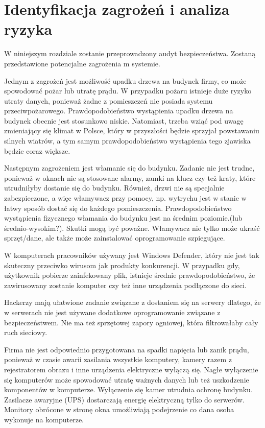 \newpage\section{Identyfikacja zagrożeń \newline i analiza ryzyka}
W niniejszym rozdziale zostanie przeprowadzony audyt bezpieczeństwa. Zostaną przedstawione potencjalne zagrożenia m systemie.

Jednym z zagrożeń jest możliwość upadku drzewa na budynek firmy, co może spowodować pożar lub utratę prądu. W przypadku pożaru istnieje duże ryzyko utraty danych, ponieważ żadne z pomieszczeń nie posiada systemu przeciwpożarowego.  Prawdopodobieństwo wystąpienia upadku drzewa na budynek obecnie jest stosunkowo niskie. Natomiast, trzeba wziąć pod uwagę zmieniający się klimat w Polsce, który w przyszłości będzie sprzyjał powstawaniu silnych wiatrów, a tym samym prawdopodobieństwo wystąpienia tego zjawiska będzie coraz większe.

Następnym zagrożeniem jest włamanie się do budynku. Zadanie nie jest trudne, ponieważ w oknach nie są stosowane alarmy, zamki na klucz czy też kraty, które utrudniłyby dostanie się do budynku. Również, drzwi nie są specjalnie zabezpieczone, a więc włamywacz przy pomocy, np. wytrychu jest w stanie w łatwy sposób dostać się do każdego pomieszczenia. Prawdopodobieństwo wystąpienia fizycznego włamania do budynku jest na średnim poziomie.(lub średnio-wysokim?). Skutki mogą być poważne. Włamywacz nie tylko może ukraść sprzęt/dane, ale także może zainstalować oprogramowanie szpiegujące.

W komputerach pracowników używany jest Windows Defender, który nie jest tak skuteczny przeciwko wirusom jak produkty konkurencji. W przypadku gdy, użytkownik pobierze zainfekowany plik, istnieje średnie prawdopodobieństwo, że zawirusowany zostanie komputer czy też inne urządzenia podłączone do sieci.

Hackerzy mają ułatwione zadanie związane z dostaniem się na serwery dlatego, że w serwerach nie jest używane dodatkowe oprogramowanie związane z bezpieczeństwem. Nie ma też sprzętowej zapory ogniowej, która filtrowałaby cały ruch sieciowy.	

Firma nie jest odpowiednio przygotowana na spadki napięcia lub zanik prądu, ponieważ w czasie awarii zasilania wszystkie komputery, kamery razem z rejestratorem obrazu i inne urządzenia elektryczne wyłączą się. Nagłe wyłączenie się komputerów może spowodować utratę ważnych danych lub też uszkodzenie komponentów w komputerze. Wyłączenie się kamer utrudnia ochronę budynku. Zasilacze awaryjne (UPS) dostarczają energię elektryczną tylko do serwerów. 
Monitory obrócone w stronę okna umożliwiają podejrzenie co dana osoba wykonuje na komputerze.

